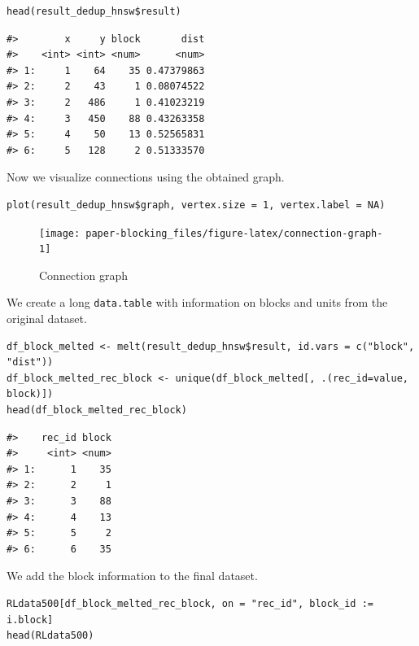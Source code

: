 \begin{verbatim}
head(result_dedup_hnsw$result)
\end{verbatim}

\begin{verbatim}
#>        x     y block       dist
#>    <int> <int> <num>      <num>
#> 1:     1    64    35 0.47379863
#> 2:     2    43     1 0.08074522
#> 3:     2   486     1 0.41023219
#> 4:     3   450    88 0.43263358
#> 5:     4    50    13 0.52565831
#> 6:     5   128     2 0.51333570
\end{verbatim}

Now we visualize connections using the obtained graph.

\begin{verbatim}
plot(result_dedup_hnsw$graph, vertex.size = 1, vertex.label = NA)
\end{verbatim}

\begin{figure}[H]

{\centering \texttt{[image: paper-blocking\_files/figure-latex/connection-graph-1]} 

}

\caption{Connection graph}\label{fig:connection-graph}
\end{figure}

We create a long \texttt{data.table} with information on blocks and units from the original dataset.

\begin{verbatim}
df_block_melted <- melt(result_dedup_hnsw$result, id.vars = c("block", "dist"))
df_block_melted_rec_block <- unique(df_block_melted[, .(rec_id=value, block)])
head(df_block_melted_rec_block)
\end{verbatim}

\begin{verbatim}
#>    rec_id block
#>     <int> <num>
#> 1:      1    35
#> 2:      2     1
#> 3:      3    88
#> 4:      4    13
#> 5:      5     2
#> 6:      6    35
\end{verbatim}

We add the block information to the final dataset.

\begin{verbatim}
RLdata500[df_block_melted_rec_block, on = "rec_id", block_id := i.block]
head(RLdata500)
\end{verbatim}

